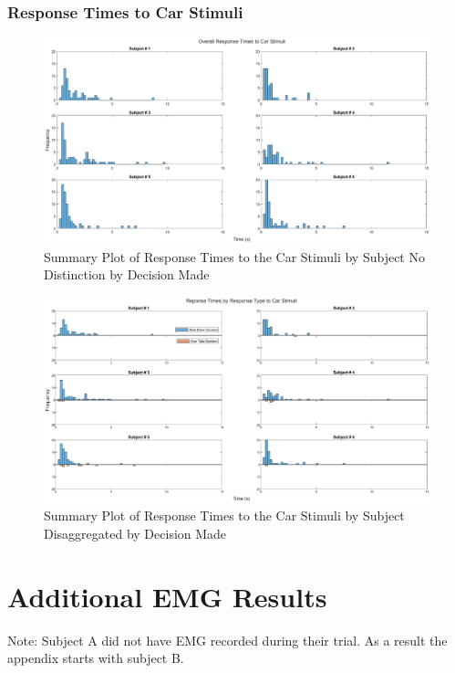 \begin{appendices}
\subsection{Response Times to Car Stimuli}
\begin{figure}[H]
    \centering
    \includegraphics[width=\linewidth, height=\plotHeight\linewidth]{figures/CarReactionTimes_by_sub.eps}
    \caption{Summary Plot of Response Times to the Car Stimuli by Subject No Distinction by Decision Made}
    \label{fig:RT_C_1bysub}
\end{figure}
\begin{figure}[H]
    \centering
    \includegraphics[width=\linewidth, height=\plotHeight\linewidth]{figures/CarReactionTimes2_by_sub.eps}
    \caption{Summary Plot of Response Times to the Car Stimuli by Subject Disaggregated by Decision Made}
    \label{fig:RT_C_2bysub}
\end{figure}


\chapter{Additional EMG Results}
\label{appendix:ExtraResults1}
Note: Subject A did not have EMG recorded during their trial. As a result the appendix starts with subject B.


\end{appendices}
